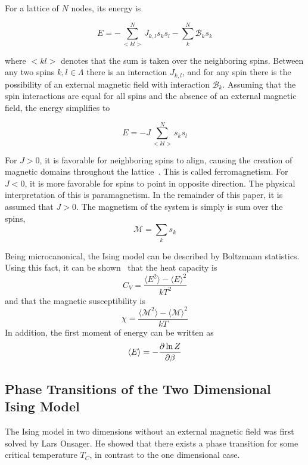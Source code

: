 \documentclass[aps,reprint]{revtex4-1}
\newcommand{\mean}[1]{\langle #1 \rangle}
\begin{document}
For a lattice of \(N\) nodes, its energy is

\begin{equation}
  \label{eq:2}
 E = -\sum_{<kl>}^{N}J_{k,l}s_{k}s_{l} - \sum_{k}^{N}\mathcal{B}_{k}s_{k}
\end{equation}

where \(<kl>\) denotes that the sum is taken over the neighboring spins.
Between any two spins \(k, l \in \Lambda\) there is an interaction \(J_{k,l}\),
and for any spin there is the possibility of an external magnetic field with
interaction \(\mathcal{B}_{k}\). Assuming that the spin interactions are equal
for all spins and the absence of an external magnetic field, the energy
simplifies to

\begin{equation}
  \label{eq:3}
  E = -J\sum_{<kl>}^{N}s_{k}s_{l}
\end{equation}

For \(J>0\), it is favorable for neighboring spins to align, causing the
creation of magnetic domains throughout the lattice~\cite{physicslectures}.
This is called ferromagnetism. For \(J<0\), it is more favorable for spins to
point in opposite direction. The physical interpretation of this is
paramagnetism. In the remainder of this paper, it is assumed that \(J>0\).
The magnetism of the system is simply is sum over the spins,
\begin{equation}
  \label{eq:1}
  \mathcal{M} = \sum_{k} s_{k}
\end{equation}

Being microcanonical, the Ising model can be described by Boltzmann statistics.
Using this fact, it can be shown~\cite{physicslectures} that the heat capacity is
\begin{equation}
  \label{eq:4}
  C_V = \frac{\mean{E^2} - \mean{E}^2}{kT^2}
\end{equation}
and that the magnetic susceptibility is
\begin{equation}
  \label{eq:5}
  \chi = \frac{\mean{\mathcal{M}^2} - \mean{\mathcal{M}}^2}{kT}
\end{equation}
In addition, the first moment of energy can be written as
\begin{equation}
  \label{eq:6}
  \mean{E} = - \pdv{\ln{Z}}{\beta}
\end{equation}

\subsection{Phase Transitions of the Two Dimensional Ising Model}
\label{sec:phase-trans-two}
The Ising model in two dimensions without an external magnetic field was first
solved by Lars Onsager. He showed that there exists a phase transition for some
critical temperature \(T_{C}\), in contrast to the one dimensional case.
\end{document}
